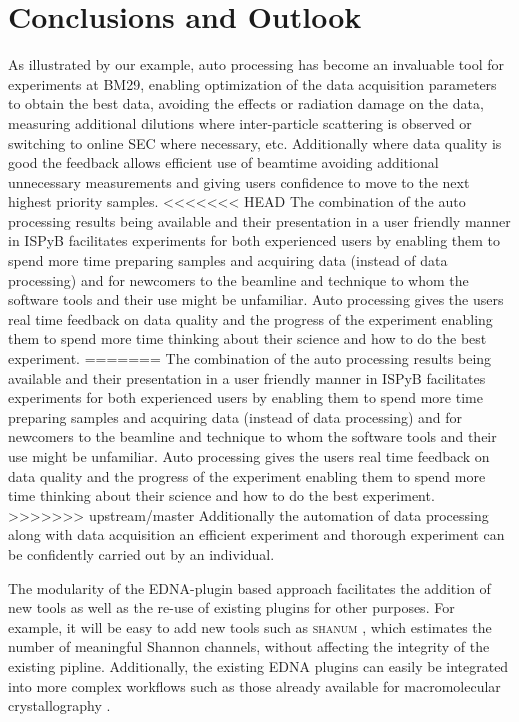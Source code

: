\documentclass[preprint,pdf]{iucr}              %
\begin{document}
\section{Conclusions and Outlook}
As illustrated by our example, auto processing has become an invaluable tool for experiments at BM29, enabling optimization of the data acquisition parameters to obtain the best data, avoiding the effects or radiation damage on the data, measuring additional dilutions where inter-particle scattering is observed or switching to online SEC where necessary, etc. Additionally where data quality is good the feedback allows efficient use of beamtime avoiding additional unnecessary measurements and giving users confidence to move to the next highest priority samples. 
<<<<<<< HEAD
The combination of the auto processing results being available and their presentation in a user friendly manner in ISPyB facilitates experiments for both experienced users by enabling them to spend more time preparing samples and acquiring data (instead of data processing) and for newcomers to the beamline and technique  to whom the software tools and their use might be unfamiliar. Auto processing gives the users real time feedback on data quality and the progress of the experiment enabling them to spend more time thinking about their science and how to do the best experiment. 
=======
The combination of the auto processing results being available and their presentation in a user friendly manner in ISPyB facilitates experiments for both experienced users by enabling them to spend more time preparing samples and acquiring data (instead of data processing) and for newcomers to the beamline and technique  to whom  the software tools and their use might be unfamiliar. Auto processing gives the users real time feedback on data quality and the progress of the experiment enabling them to spend more time thinking about their science and how to do the best experiment. 
>>>>>>> upstream/master
Additionally the automation of data processing along with data acquisition an efficient experiment and thorough experiment can be confidently carried out by an individual. 

The modularity of the EDNA-plugin based approach facilitates the addition of new tools as well as the re-use of existing plugins for other purposes. For example, it will be easy to add new tools such as \textsc{shanum} \cite{SHANUM}, which estimates the number of meaningful Shannon channels, without affecting the integrity of the existing pipline. Additionally, the existing EDNA plugins can easily be integrated into more complex workflows such as those already available for macromolecular crystallography \cite{workflow}. 
\end{document}

